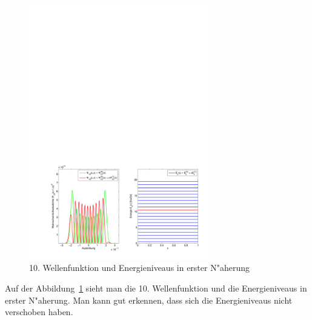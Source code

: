\begin{refsection}
\begin{figure}[h]	%
\centering
\includegraphics[width=0.7\textwidth]{anharmonisch/images/x3/Stoerung1Wellenfunktion.pdf}
\caption{10. Wellenfunktion und Energieniveaus in erster N"aherung
\label{skript:x3_Stoerung1Wellenfunktion}}
\end{figure}

Auf der Abbildung~\ref{skript:x3_Stoerung1Wellenfunktion} sieht man die 10. Wellenfunktion und die Energieniveaus in erster N"aherung. Man kann gut erkennen, dass sich die Energieniveaus nicht verschoben haben.


\end{refsection}
